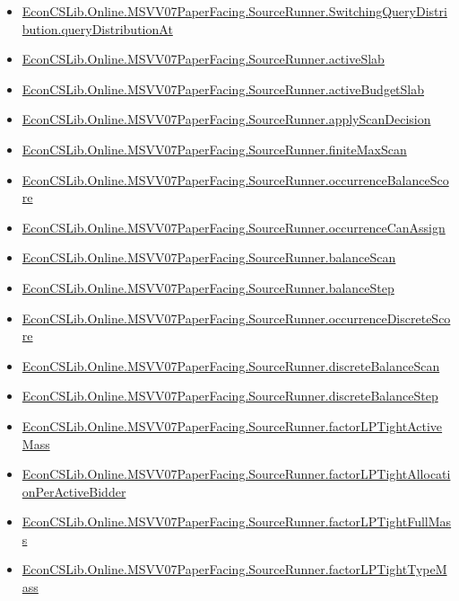 \documentclass[10pt]{article}
\begin{document}
\begin{itemize}[leftmargin=1.2em]
\begin{itemize}[leftmargin=1.2em]
\item \hyperlink{library-prerequisite-02b3108418a18f40}{EconCSLib.Online.MSVV07PaperFacing.SourceRunner.SwitchingQueryDistribution.queryDistributionAt}
\item \hyperlink{library-prerequisite-2ce7c013b5a5022f}{EconCSLib.Online.MSVV07PaperFacing.SourceRunner.activeSlab}
\item \hyperlink{library-prerequisite-601df24f44f05930}{EconCSLib.Online.MSVV07PaperFacing.SourceRunner.activeBudgetSlab}
\item \hyperlink{library-prerequisite-0b35bc5b49893306}{EconCSLib.Online.MSVV07PaperFacing.SourceRunner.applyScanDecision}
\item \hyperlink{library-prerequisite-ce720599603ee67d}{EconCSLib.Online.MSVV07PaperFacing.SourceRunner.finiteMaxScan}
\item \hyperlink{library-prerequisite-547eb47ff76918b6}{EconCSLib.Online.MSVV07PaperFacing.SourceRunner.occurrenceBalanceScore}
\item \hyperlink{library-prerequisite-43a1b66256f7c0f1}{EconCSLib.Online.MSVV07PaperFacing.SourceRunner.occurrenceCanAssign}
\item \hyperlink{library-prerequisite-040bd7c8e2081c60}{EconCSLib.Online.MSVV07PaperFacing.SourceRunner.balanceScan}
\item \hyperlink{library-prerequisite-19c637ef731fb2e7}{EconCSLib.Online.MSVV07PaperFacing.SourceRunner.balanceStep}
\item \hyperlink{library-prerequisite-916895ffe5880eaf}{EconCSLib.Online.MSVV07PaperFacing.SourceRunner.occurrenceDiscreteScore}
\item \hyperlink{library-prerequisite-3d977ffbe5474a41}{EconCSLib.Online.MSVV07PaperFacing.SourceRunner.discreteBalanceScan}
\item \hyperlink{library-prerequisite-1d494cf1f428387c}{EconCSLib.Online.MSVV07PaperFacing.SourceRunner.discreteBalanceStep}
\item \hyperlink{library-prerequisite-1905a982860222dd}{EconCSLib.Online.MSVV07PaperFacing.SourceRunner.factorLPTightActiveMass}
\item \hyperlink{library-prerequisite-f421f3d2c305d46a}{EconCSLib.Online.MSVV07PaperFacing.SourceRunner.factorLPTightAllocationPerActiveBidder}
\item \hyperlink{library-prerequisite-fa73770b81726259}{EconCSLib.Online.MSVV07PaperFacing.SourceRunner.factorLPTightFullMass}
\item \hyperlink{library-prerequisite-f674e682c96138ac}{EconCSLib.Online.MSVV07PaperFacing.SourceRunner.factorLPTightTypeMass}

\end{itemize}
\end{itemize}
\end{document}
